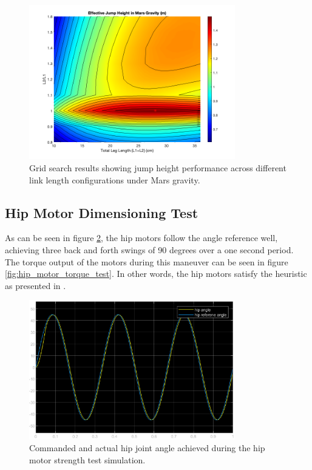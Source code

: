 \begin{figure}[h]
    \centering
    \includegraphics[width=0.8\textwidth]{Images/results/grid_search_mars.png}
    \caption{Grid search results showing jump height performance across different link length configurations under Mars gravity.}
    \label{fig:results:grid_search_mars}
\end{figure}


\subsection{Hip Motor Dimensioning Test}
\label{sec:hip_motor_dimensioning_test}

As can be seen in figure \ref{fig:hip_motor_strength_test}, the hip motors follow the angle reference well, achieving three back and forth swings of 90 degrees over a one second period. The torque output of the motors during this maneuver can be seen in figure \ref{fig:hip_motor_torque_test}. In other words, the hip motors satisfy the heuristic as presented in \cite{finn_tarek_master}.

\begin{figure}[H]
    \centering
    \includegraphics[width=0.8\textwidth]{Images/attitude_stable_test_result.eps}
    \caption{Commanded and actual hip joint angle achieved during the hip motor strength test simulation. }
    \label{fig:hip_motor_strength_test}
\end{figure}

